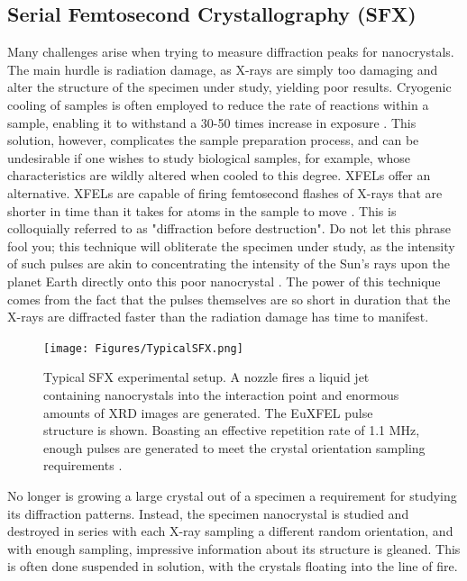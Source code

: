 \documentclass[aps,prb,twocolumn,superscriptaddress]{revtex4-2}
\begin{document}
\subsection{Serial Femtosecond Crystallography (SFX)}
Many challenges arise when trying to measure diffraction peaks for
nanocrystals. The main hurdle is radiation damage, as X-rays are simply too
damaging and alter the structure of the specimen under study, yielding poor
results. Cryogenic cooling of samples is often employed to reduce the rate of
reactions within a sample, enabling it to withstand a 30-50 times increase in
exposure \cite{owen2006experimental}. This solution, however, complicates the
sample preparation process, and can be undesirable if one wishes to study
biological samples, for example, whose characteristics are wildly altered when
cooled to this degree. XFELs offer an alternative. XFELs are capable of
firing femtosecond flashes of X-rays that are shorter in time than it takes for
atoms in the sample to move \cite{neutze2000potential}. This is colloquially
referred to as "diffraction before destruction". Do not let this phrase fool
you; this technique will obliterate the specimen under study, as the intensity
of such pulses are akin to concentrating the intensity of the Sun's rays upon 
the planet Earth directly onto this poor nanocrystal \cite{SophiaChen}.
The power of this technique comes from the fact that the pulses themselves are
so short in duration that the X-rays are diffracted faster than the radiation
damage has time to manifest.

\begin{figure}[h]
    \centering
    \texttt{[image: Figures/TypicalSFX.png]}
    \caption{Typical SFX experimental setup. A nozzle fires a liquid jet 
    containing nanocrystals into the interaction point and enormous amounts of 
    XRD images are generated. The EuXFEL pulse structure is shown. Boasting an 
    effective repetition rate of 1.1 MHz, enough pulses are generated to 
    meet the crystal orientation sampling requirements \cite{Rahmani2023}.}
        \label{fig:SFX}
\end{figure}

No longer is growing a large crystal out of a specimen a requirement for
studying its diffraction patterns. Instead, the specimen nanocrystal is studied
and destroyed in series with each X-ray sampling a different random
orientation, and with enough sampling, impressive information about its
structure is gleaned. This is often done suspended in solution, with the
crystals floating into the line of fire. 
\end{document}
